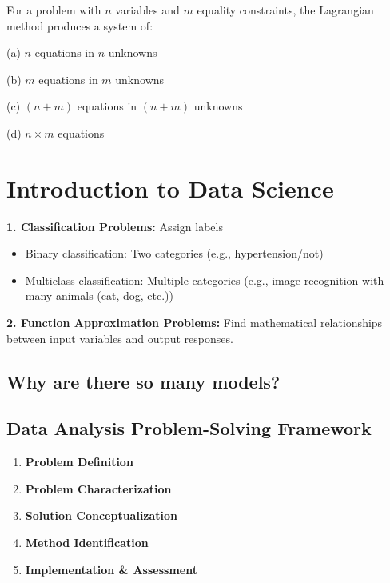 \documentclass[11pt,a4paper]{article}
\theoremstyle{definition}
\begin{document}
\begin{quesbox}[Question]
For a problem with $n$ variables and $m$ equality constraints, the Lagrangian method produces a system of:

(a) $n$ equations in $n$ unknowns

(b) $m$ equations in $m$ unknowns

(c) $(n+m)$ equations in $(n+m)$ unknowns

(d) $n \times m$ equations
\end{quesbox}


\section*{Introduction to Data Science}

\begin{defbox}
\textbf{1. Classification Problems:} Assign labels 
\begin{itemize}
\item Binary classification: Two categories (e.g., hypertension/not)
\item Multiclass classification: Multiple categories (e.g., image recognition with many animals (cat, dog, etc.))
\end{itemize}
\textbf{2. Function Approximation Problems:} Find mathematical relationships between input variables and output responses.
\end{defbox}

\subsection*{Why are there so many models?}
\vspace{50mm}

\subsection*{Data Analysis Problem-Solving Framework}

\begin{defbox}
\begin{enumerate}
    \item \textbf{Problem Definition}
    \item \textbf{Problem Characterization}
    \item \textbf{Solution Conceptualization}
    \item \textbf{Method Identification}
    \item \textbf{Implementation \& Assessment}
\end{enumerate}
\end{defbox}
\end{document}
